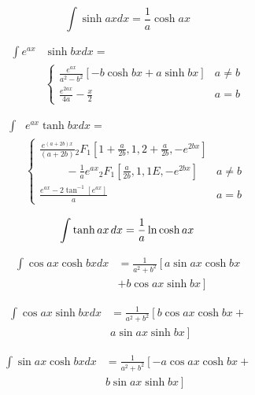 \documentclass[../main.tex]{subfiles}
\begin{document}
    \begin{equation*}
    \int \sinh ax dx = \frac{1}{a} \cosh ax 
    \end{equation*}
    
    \begin{align*}
    \int e^{ax}& \sinh bx dx = \nonumber \\ &
    \begin{cases}
    \displaystyle{\frac{e^{ax}}{a^2-b^2} }[ -b \cosh bx + a \sinh bx ]  & a\ne b \\
    \displaystyle{\frac{e^{2ax}}{4a} - \frac{x}{2}}  & a = b
    \end{cases}
    \end{align*}
    
    \begin{align*}
    \int & e^{ax} \tanh bx dx = \nonumber \\ &
    \begin{cases}
    \displaystyle{ \frac{ e^{(a+2b)x}}{(a+2b)} 
    {_2F_1}\left[ 1+\frac{a}{2b},1,2+\frac{a}{2b}, -e^{2bx}\right] }& \\
    \displaystyle{
    \hspace{1cm}-\frac{1}{a}e^{ax}{_2F_1}\left[ \frac{a}{2b},1,1E, -e^{2bx}\right]
    }
     & a\ne b \\
    \displaystyle{\frac{e^{ax}-2\tan^{-1}[e^{ax}]}{a} } & a = b
    \end{cases}
    \end{align*}
    
    \begin{equation*}
    \int  \tanh ax\hspace{1.5pt} dx =\frac{1}{a} \ln \cosh ax 
    \end{equation*}
    
    \begin{align*}
    \int \cos ax \cosh bx dx &= 
    \frac{1}{a^2 + b^2} \left[
    a \sin ax \cosh bx  \right . \nonumber \\ & \left. + b \cos ax \sinh bx
    \right] 
    \end{align*}
    
    \begin{align*}
    \int \cos ax \sinh bx dx& = 
    \frac{1}{a^2 + b^2} \left[
    b \cos ax \cosh bx +
    \right . \nonumber \\ & \left .
     a \sin ax \sinh bx
    \right] 
    \end{align*}
    
    \begin{align*}
    \int \sin ax \cosh bx dx &= 
    \frac{1}{a^2 + b^2} \left[
    -a \cos ax \cosh bx +
    \right . \nonumber \\ & \left .
     b \sin ax \sinh bx
    \right] 
    \end{align*}
    
\end{document}
